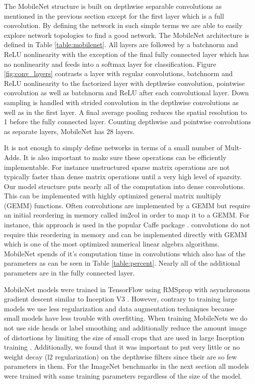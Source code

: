 \documentclass[10pt,twocolumn,letterpaper]{article}
\begin{document}
The MobileNet structure is built on depthwise separable convolutions as mentioned in the previous section except for the first layer which is a full convolution. By defining the network in such simple terms we are able to easily explore network topologies to find a good network. The MobileNet architecture is defined in Table \ref{table:mobilenet}. All layers are followed by a batchnorm \cite{ioffe2015batch} and ReLU nonlinearity with the exception of the final fully connected layer which has no nonlinearity and feeds into a softmax layer for classification. Figure \ref{fig:conv_layers} contrasts a layer with regular convolutions, batchnorm and ReLU nonlinearity to the factorized layer with depthwise convolution,  pointwise convolution as well as batchnorm and ReLU after each convolutional layer. Down sampling is handled with strided convolution in the depthwise convolutions as well as in the first layer. A final average pooling reduces the spatial resolution to 1 before the fully connected layer. Counting depthwise and pointwise convolutions as separate layers, MobileNet has 28 layers.

It is not enough to simply define networks in terms of a small number of Mult-Adds. It is also important to make sure these operations can be efficiently implementable. For instance unstructured sparse matrix operations are not typically faster than dense matrix operations until a very high level of sparsity. Our model structure puts nearly all of the computation into dense  convolutions. This can be implemented with highly optimized general matrix multiply (GEMM) functions. Often convolutions are implemented by a GEMM but require an initial reordering in memory called im2col in order to map it to a GEMM. For instance, this approach is used in the popular Caffe package \cite{jia2014caffe}.  convolutions do not require this reordering in memory and can be implemented directly with GEMM which is one of the most optimized numerical linear algebra algorithms. MobileNet spends  of it's computation time in  convolutions which also has  of the parameters as can be seen in Table \ref{table:percent}. Nearly all of the additional parameters are in the fully connected layer.

MobileNet models were trained in TensorFlow \cite{abadi2015tensorflow} using RMSprop \cite{tieleman2012lecture} with asynchronous gradient descent similar to Inception V3 \cite{szegedy2015rethinking}. However, contrary to training large models we use less regularization and data augmentation techniques because small models have less trouble with overfitting. When training MobileNets we do not use side heads or label smoothing and additionally reduce the amount image of distortions by limiting the size of small crops that are used in large Inception training \cite{szegedy2015rethinking}. Additionally, we found that it was important to put very little or no weight decay (l2 regularization) on the depthwise filters since their are so few parameters in them. For the ImageNet benchmarks in the next section all models were trained with same training parameters regardless of the size of the model.  
\end{document}

